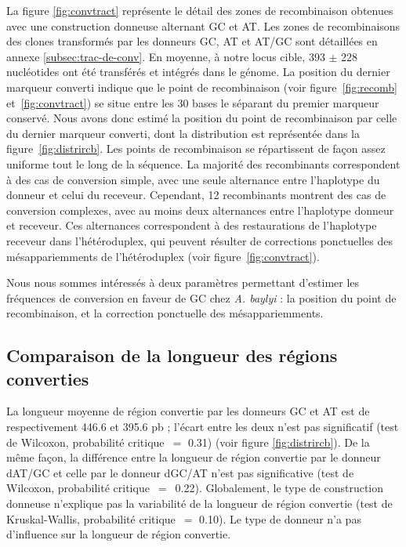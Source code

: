 La figure \ref{fig:convtract} représente le détail des zones de recombinaison
obtenues avec une construction donneuse alternant GC et AT. Les zones de
recombinaisons des clones transformés par les donneurs GC, AT et AT/GC sont
détaillées en annexe \ref{subsec:trac-de-conv}. En moyenne, à notre locus cible,
\num{393} \(\pm\) \num{228} nucléotides ont été transférés et intégrés dans le
génome. La position du dernier marqueur converti indique que le point de
recombinaison (voir figure~\ref{fig:recomb} et~\ref{fig:convtract}) se situe
entre les 30 bases le séparant du premier marqueur conservé. Nous avons donc
estimé la position du point de recombinaison par celle du dernier marqueur
converti, dont la distribution est représentée dans la
figure~\ref{fig:distrircb}. Les points de recombinaison se répartissent de façon
assez uniforme tout le long de la séquence. La majorité des recombinants
correspondent à des cas de conversion simple, avec une seule alternance entre
l'haplotype du donneur et celui du receveur. Cependant, \num{12} recombinants
montrent des cas de conversion complexes, avec au moins deux alternances entre
l'haplotype donneur et receveur. Ces alternances correspondent à des
restaurations de l'haplotype receveur dans l'hétéroduplex, qui peuvent résulter
de corrections ponctuelles des mésappariemments de l'hétéroduplex (voir
figure~\ref{fig:convtract}).

Nous nous sommes intéressés à deux paramètres permettant d'estimer les
fréquences de conversion en faveur de GC chez \emph{A. baylyi} : la position du
point de recombinaison, et la correction ponctuelle des mésappariemments.


\subsection{Comparaison de la longueur des régions converties}
\label{subsec:longueur}

La longueur moyenne de région convertie par les donneurs GC et AT est de
respectivement \num{446.6} et \num{395.6} pb ; l'écart entre les deux n'est pas
significatif (test de Wilcoxon, probabilité critique~\(=\) \num{0.31}) (voir
figure \ref{fig:distrircb}). De la même façon, la différence entre la longueur
de région convertie par le donneur dAT/GC et celle par le donneur dGC/AT n'est
pas significative (test de Wilcoxon, probabilité critique~\(=\)~\num{0.22}).
Globalement, le type de construction donneuse n'explique pas la variabilité de
la longueur de région convertie (test de Kruskal-Wallis, probabilité
critique~\(=\) \num{0.10}). Le type de donneur n'a pas d'influence sur la
longueur de région convertie.

